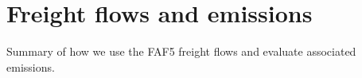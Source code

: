 \section{Freight flows and emissions}
\label{sec:freight_flows}
Summary of how we use the FAF5 freight flows and evaluate associated emissions.